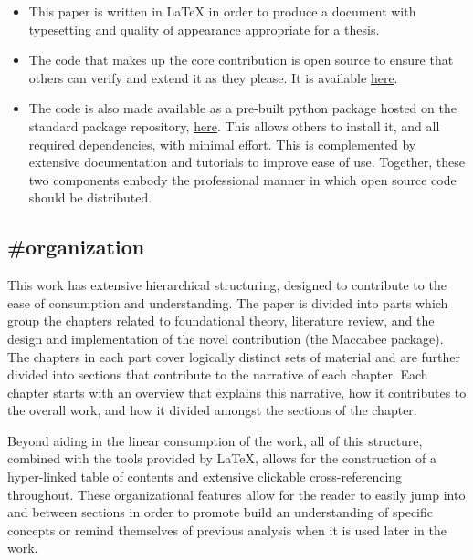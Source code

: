 \documentclass[./main.tex]{subfiles}
\begin{document}
\begin{itemize}
    \item This paper is written in \LaTeX \(  \) in order to produce a document with typesetting and quality of appearance appropriate for a thesis.
    
    \item The code that makes up the core contribution is open source to ensure that others can verify and extend it as they please. It is available \href{https://github.com/JoshBroomberg/Maccabee}{here}.
    
    \item The code is also made available as a pre-built python package hosted on the standard package repository, \href{https://pypi.org/project/maccabee/}{here}. This allows others to install it, and all required dependencies, with minimal effort. This is complemented by extensive documentation and tutorials to improve ease of use. Together, these two components embody the professional manner in which open source code should be distributed.
\end{itemize}


\subsection{\textbf{\#organization}}
\label{hc:organization}

This work has extensive hierarchical structuring, designed to contribute to the ease of consumption and understanding. The paper is divided into parts which group the chapters related to foundational theory, literature review, and the design and implementation of the novel contribution (the Maccabee package). The chapters in each part cover logically distinct sets of material and are further divided into sections that contribute to the narrative of each chapter. Each chapter starts with an overview that explains this narrative, how it contributes to the overall work, and how it divided amongst the sections of the chapter.

\vspace{\baselineskip}

Beyond aiding in the linear consumption of the work, all of this structure, combined with the tools provided by \LaTeX, allows for the construction of a hyper-linked table of contents and extensive clickable cross-referencing throughout. These organizational features allow for the reader to easily jump into and between sections in order to promote build an understanding of specific concepts or remind themselves of previous analysis when it is used later in the work.
\end{document}
